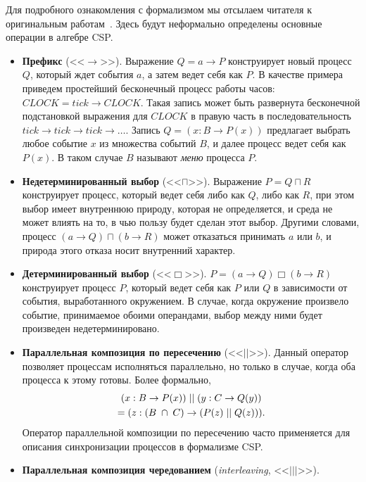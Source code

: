 \documentclass[a4, 14pt]{article}
\begin{document}
Для подробного ознакомления с формализмом мы отсылаем читателя к оригинальным 
работам~\cite{hoare1978communicating, brookes1984theory, hoare1985csp}. 
Здесь будут неформально определены основные операции в алгебре CSP.
\begin{itemize}
  \item \textbf{Префикс} (<<$\rightarrow$>>). Выражение $Q=a\rightarrow{P}$ конструирует 
    новый процесс $Q$, который ждет события $a$, а затем ведет себя как $P$. 
    В качестве примера приведем простейший бесконечный процесс работы часов: 
    $CLOCK=tick\rightarrow{CLOCK}$. Такая запись может быть развернута бесконечной 
    подстановкой выражения для $CLOCK$ в правую часть в последовательность 
    $tick\rightarrow{tick}\rightarrow{tick}\rightarrow\dots$. Запись 
    $Q=(x:B\rightarrow{P(x)})$ предлагает выбрать любое событие $x$ из множества 
    событий $B$, и далее процесс ведет себя как $P(x)$. В таком случае $B$ 
    называют \textit{меню} процесса $P$.
  \item \textbf{Недетерминированный выбор} (<<$\sqcap$>>). Выражение $P=Q\sqcap{R}$ 
    конструирует процесс, который ведет себя либо как $Q$, либо как $R$, при 
    этом выбор имеет внутреннюю природу, которая не определяется, и среда не 
     может влиять на то, в чью пользу будет сделан этот выбор. Другими словами, 
    процесс $(a\rightarrow{Q})\sqcap(b\rightarrow{R})$ может отказаться принимать $a$
    или $b$, и природа этого отказа носит внутренний характер.
  \item \textbf{Детерминированный выбор} (<<$\Box$>>). $P=(a\rightarrow{Q})\Box(b\rightarrow{R})$ 
    конструирует процесс $P$, который ведет себя как $P$ или $Q$ в зависимости 
    от события, выработанного окружением. В случае, когда окружение произвело 
    событие, принимаемое обоими операндами, выбор между ними будет произведен 
    недетерминировано.
  \item \textbf{Параллельная композиция по пересечению} (<<$||$>>). Данный оператор 
    позволяет процессам исполняться параллельно, но только в случае, когда оба 
    процесса к этому готовы. Более формально, 
    \begin{multline}
      $$(x:B\rightarrow{P}(x))\;||\;(y:C\rightarrow{Q}(y))\\
        =(z:(B\;\cap\;{C})\rightarrow(P(z)\;||\;Q(z))).$$
    \end{multline}
    Оператор параллельной композиции по пересечению часто применяется для 
    описания синхронизации процессов в формализме CSP. 
  \item \textbf{Параллельная композиция чередованием} (\textit{interleaving}, <<$|||$>>). 

\end{itemize}
\end{document}
